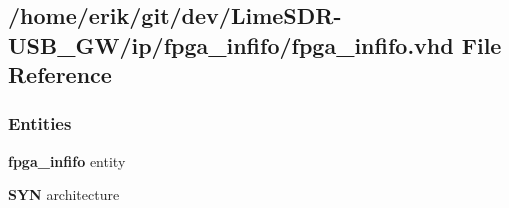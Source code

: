 \subsection{/home/erik/git/dev/\+Lime\+S\+D\+R-\/\+U\+S\+B\+\_\+\+G\+W/ip/fpga\+\_\+infifo/fpga\+\_\+infifo.vhd File Reference}
\label{fpga__infifo_8vhd}
\subsubsection*{Entities}
\begin{DoxyCompactItemize}
\item 
{\bf fpga\+\_\+infifo} entity
\item 
{\bf S\+YN} architecture
\end{DoxyCompactItemize}
